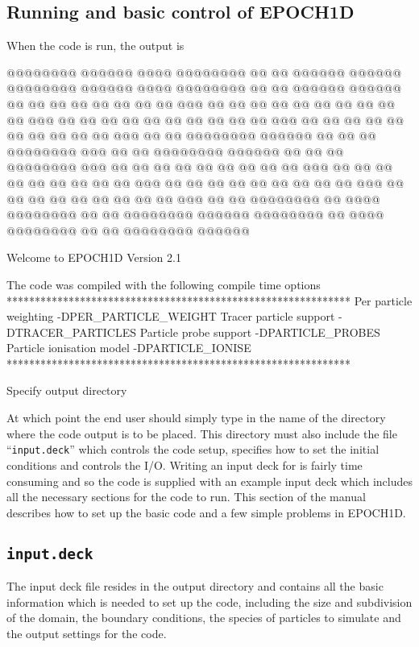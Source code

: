 \documentclass[12pt,a4paper]{article}
\newcommand{\code}[1]{{\texttt{#1}}}
\newcommand{\qtt}[1]{``{\code{#1}}''}
\newcommand{\EPOCH}{{\color{warwickdark}\fontfamily{phv}\selectfont{EPOCH}}}
\newenvironment{lboxverbatim}[1]{
\setlength{\FrameSep}{0pt}
\def\FrameCommand{\fboxsep=0pt \colorbox{shadecolor}}
\MakeFramed{\FrameRestore}
\vspace{-13.5pt}
\fvset{label=#1}
\boxverb
}{
\endboxverb
\vspace{-13.5pt}
\endMakeFramed
}
\begin{document}
\subsection{Running {\EPOCH} and basic control of EPOCH1D}
When the code is run, the output is
\begin{lboxverbatim}{Command line output}
@@@@@@@@  @@@@@@      @@@@    @@@@@@@@  @@    @@    @@@@@@    @@@@@@
@@@@@@@@  @@@@@@      @@@@    @@@@@@@@  @@    @@    @@@@@@    @@@@@@
@@        @@    @@  @@    @@  @@        @@    @@       @@@    @@  @@
@@        @@    @@  @@    @@  @@        @@    @@       @@@    @@  @@
@@        @@    @@  @@    @@  @@        @@    @@       @@@    @@    @@
@@        @@    @@  @@    @@  @@        @@    @@       @@@    @@    @@
@@@@@@@@  @@@@@@    @@    @@  @@        @@@@@@@@       @@@    @@    @@
@@@@@@@@  @@@@@@    @@    @@  @@        @@@@@@@@       @@@    @@    @@
@@        @@        @@    @@  @@        @@    @@       @@@    @@    @@
@@        @@        @@    @@  @@        @@    @@       @@@    @@    @@
@@        @@        @@    @@  @@        @@    @@       @@@    @@  @@
@@        @@        @@    @@  @@        @@    @@       @@@    @@  @@
@@@@@@@@  @@          @@@@    @@@@@@@@  @@    @@    @@@@@@@@  @@@@@@
@@@@@@@@  @@          @@@@    @@@@@@@@  @@    @@    @@@@@@@@  @@@@@@

Welcome to EPOCH1D Version 2.1

 The code was compiled with the following compile time options
 *************************************************************
 Per particle weighting -DPER_PARTICLE_WEIGHT
 Tracer particle support -DTRACER_PARTICLES
 Particle probe support -DPARTICLE_PROBES
 Particle ionisation model -DPARTICLE_IONISE
 *************************************************************

 Specify output directory
\end{lboxverbatim}

At which point the end user should simply type in the name of the directory
where the code output is to be placed. This directory must also include the
file \qtt{input.deck} which controls the code setup, specifies how to set the
initial conditions and controls the I/O. Writing an input deck for {\EPOCH} is
fairly time consuming and so the code is supplied with an example input deck
which includes all the necessary sections for the code to run. This section of
the manual describes how to set up the basic code and a few simple problems in
EPOCH1D.

\subsection{\code{input.deck}}
The input deck file resides in the output directory and contains all the basic
information which is needed to set up the code, including the size and
subdivision of the domain, the boundary conditions, the species of particles to
simulate and the output settings for the code.
\end{document}
